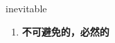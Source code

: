 
\begin{frame}
{\huge inevitable}
\begin{center}
\begin{enumerate}\Large
  \item \textbf{不可避免的，必然的}
\end{enumerate}
\end{center}
\end{frame}
